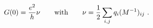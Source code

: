 \begin{equation}
G(0)=\frac{e^{2}}{h}\nu \quad \quad {\rm with} \qquad \nu =\frac{1}{2}%
\sum_{i,j}q_{i}(M^{-1})_{ij}~.  \label{nu}
\end{equation}%
